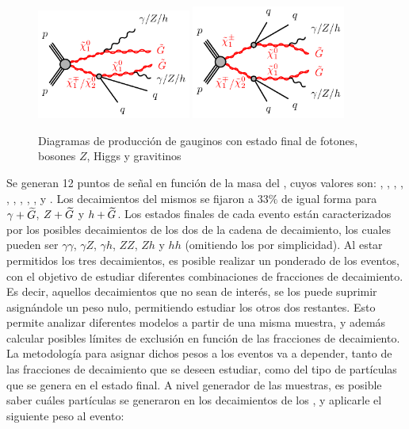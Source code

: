 \begin{figure}
  \centering
  \includegraphics[width=0.45\textwidth]{images/analysis_EWK/N1N2C1-qqZhphGG-GGM.pdf}%
  \includegraphics[width=0.45\textwidth]{images/analysis_EWK/C1C1N2-qqqqZhphGG-GGM.pdf}
  \caption{Diagramas de producción de gauginos con estado final de fotones, bosones $Z$, Higgs y gravitinos}
  \label{fig:EWK_GGM_diagrams}
\end{figure}


Se generan 12 puntos de señal en función de la masa del \ninoone, cuyos valores son: , , , , , , , , ,  y . Los decaimientos del mismos se fijaron a $33\%$ de igual forma para $\gamma + \widetilde{G}$, $Z + \widetilde{G}$ y $h + \widetilde{G}$. Los estados finales de cada evento están caracterizados por los posibles decaimientos de los dos \ninoone de la cadena de decaimiento, los cuales pueden ser $\gamma\gamma$, $\gamma Z$, $\gamma h$, $ZZ$, $Zh$ y $hh$ (omitiendo los \gravino por simplicidad). Al estar permitidos los tres decaimientos, es posible realizar un ponderado de los eventos, con el objetivo de estudiar diferentes combinaciones de fracciones de decaimiento. Es decir, aquellos decaimientos que no sean de interés, se los puede suprimir asignándole un peso nulo, permitiendo estudiar los otros dos restantes. Esto permite analizar diferentes modelos a partir de una misma muestra, y además calcular posibles límites de exclusión en función de las fracciones de decaimiento.
La metodología para asignar dichos pesos a los eventos va a depender, tanto de las fracciones de decaimiento que se deseen estudiar, como del tipo de partículas que se genera en el estado final. A nivel generador de las muestras, es posible saber cuáles partículas se generaron en los decaimientos de los \ninoone, y aplicarle el siguiente peso al evento:

